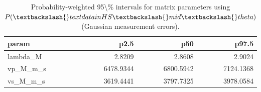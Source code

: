 \begin{table}[ht!]
\centering
\caption{Probability-weighted 95\textbackslash{}\% intervals for matrix parameters using $P(\textbackslash{}text{data in HS}\textbackslash{}mid\textbackslash{}theta)$ (Gaussian measurement errors).}
\label{tab:hs\_prob\_weighted\_95ci}
\begin{tabular}{lrrr}
\toprule
\textbf{param} & \textbf{p2.5} & \textbf{p50} & \textbf{p97.5} \\
\midrule
lambda\_M & 2.8209 & 2.8608 & 2.9024 \\
vp\_M\_m\_s & 6478.9344 & 6800.5942 & 7124.1368 \\
vs\_M\_m\_s & 3619.4441 & 3797.7325 & 3978.0584 \\
\bottomrule
\end{tabular}
\end{table}
